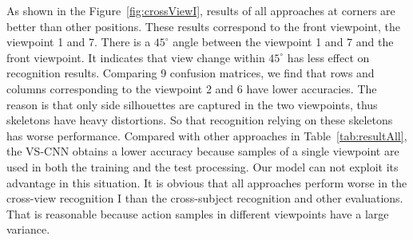 \documentclass[journal]{IEEEtran}
\begin{document}
\begin{figure*}
 \centering
 \hspace{1in}
 \caption{Confusion matrices of the cross-view I recognition. Results of all approaches at corners are better than other positions because they correspond to the front, 1 and 7 viewpoints. In confusion matrices, rows and columns corresponding to the viewpoint 2 and 6 have lower accuracies because of skeleton distortions.}
 \label{fig:crossViewI} \end{figure*}

As shown in the Figure~\ref{fig:crossViewI}, results of all approaches at corners are better than other positions. These results correspond to the front viewpoint, the viewpoint 1 and 7. There is a $45^\circ$ angle between the viewpoint 1 and 7 and the front viewpoint. It indicates that view change within $45^\circ$ has less effect on recognition results. Comparing 9 confusion matrices, we find that rows and columns corresponding to the viewpoint 2 and 6 have lower accuracies. The reason is that only side silhouettes are captured in the two viewpoints, thus skeletons have heavy distortions. So that recognition relying on these skeletons has worse performance. Compared with other approaches in Table~\ref{tab:resultAll}, the VS-CNN obtains a lower accuracy because samples of a single viewpoint are used in both the training and the test processing. Our model can not exploit its advantage in this situation. It is obvious that all approaches perform worse in the cross-view recognition I than the cross-subject recognition and other evaluations. That is reasonable because action samples in different viewpoints have a large variance.
\end{document}
